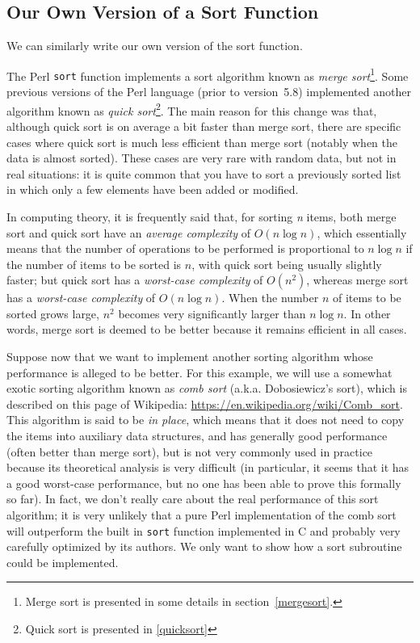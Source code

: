 \subsection{Our Own Version of a Sort Function}
\label{combsort}

We can similarly write our own version of the sort 
function. 


The Perl {\tt sort} function implements a sort 
algorithm known as \emph{merge sort}\footnote{Merge 
sort is presented in some details in 
section~\ref{mergesort}.}.  Some 
previous versions of the Perl language (prior to 
version~5.8) implemented another algorithm known 
as \emph{quick sort}\footnote{Quick sort is presented 
in \ref{quicksort}}. The main reason for this 
change was that, although quick sort is on average  
a bit faster than merge sort, there are specific 
cases where quick sort is much less efficient than 
merge sort (notably when the data is almost sorted). 
These cases are very rare with random data, but not 
in real situations: it is quite common that you have 
to sort a previously sorted list in which only a 
few elements have been added or modified.

In computing theory, it is frequently said that, for 
sorting \emph{n} items, both merge sort and quick 
sort have an \emph{average complexity} of $O(n \log n)$, 
which essentially means that the number of operations 
to be performed is proportional to $n \log n$ if 
the number of items to be sorted is $n$, 
with quick sort being usually slightly faster; but 
quick sort has a \emph{worst-case complexity} of 
$O(n^{2})$, whereas merge sort has a \emph{worst-case 
complexity} of $O(n \log n)$. When the number $n$ of 
items to be sorted grows large, $n^{2}$ becomes 
very significantly larger than $n \log n$. In other 
words, merge sort is deemed to be better because it 
remains efficient in all cases.

Suppose now that we want to implement another sorting 
algorithm whose performance is alleged to be better. 
For this example, we will use a somewhat exotic sorting 
algorithm known as \emph{comb sort} (a.k.a. Dobosiewicz's 
sort), which is described on this page of Wikipedia:
\url{https://en.wikipedia.org/wiki/Comb_sort}. This 
algorithm is said to be \emph{in place}, which means that 
it does not need to copy the items into auxiliary data 
structures, and has generally good performance (often better 
than merge sort), but is not very commonly used in 
practice because its theoretical analysis is very difficult 
(in particular, it seems that it has a good worst-case 
performance, but no one has been able to prove this 
formally so far). In fact, we don't really care about 
the real performance of this sort algorithm; it is 
very unlikely that a pure Perl implementation 
of the comb sort will outperform the built in 
{\tt sort} function implemented in C and probably very 
carefully optimized by its authors. We only want to 
show how a sort subroutine could be implemented.


